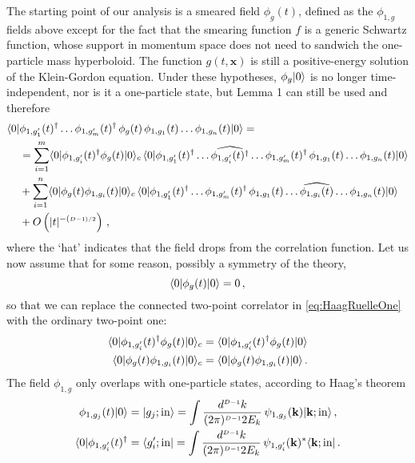The starting point of 
our analysis is a smeared field $\phi_g(t)$, defined as the $\phi_{1,g}$ fields above
except for the fact that the smearing function $f$ is a generic Schwartz function, 
whose support in momentum space does not need to sandwich the one-particle mass 
hyperboloid. The function $g(t,\mathbf{x})$ is still a positive-energy solution of 
the Klein-Gordon equation. Under these hypotheses, $\phi_{g} | 0 \rangle$ is no longer 
time-independent, nor is it a one-particle state, but Lemma 1 can still be used and 
therefore
\begin{align}
    \langle 0 | &\phi_{1,g'_1}(t)^\dagger \ldots \phi_{1,g'_m}(t)^\dagger \, 
        \phi_{g}(t) \, 
        \phi_{1,g_1}(t) \ldots \phi_{1,g_n}(t) | 0 \rangle = \nonumber \\
        &= \sum_{i=1}^m \langle 0 | \phi_{1,g'_i}(t)^\dagger \phi_{g}(t) | 0 \rangle_c \,
        \langle 0 | \phi_{1,g'_1}(t)^\dagger \ldots \widehat{\phi_{1,g'_i}(t)^\dagger}
        \ldots \phi_{1,g'_m}(t)^\dagger \, 
        \phi_{1,g_1}(t) \ldots \phi_{1,g_n}(t) | 0 \rangle \nonumber \\
        &+ \sum_{i=1}^n \langle 0 | \phi_{g}(t) \phi_{1,g_i}(t) | 0 \rangle_c \,
        \langle 0 | \phi_{1,g'_1}(t)^\dagger \ldots \phi_{1,g'_m}(t)^\dagger \, 
        \phi_{1,g_1}(t) \ldots \widehat{\phi_{1,g_i}(t)}
        \ldots \phi_{1,g_n}(t) | 0 \rangle \nonumber \\
        \label{eq:HaagRuelleOne}
        & + O\left(|t|^{-(\scriptscriptstyle{D-1})/2}\right)\, ,
\end{align}
where the `hat' indicates that the field drops from the correlation function. Let us
now assume that for some reason, possibly a symmetry of the theory, 
\begin{equation}
    \label{eq:SymmetryCondition}
    \langle 0 | \phi_{g}(t) | 0 \rangle = 0 \, ,
\end{equation}
so that we can replace the connected two-point correlator in \eqref{eq:HaagRuelleOne}
with the ordinary two-point one: 
\begin{align}
    \label{eq:ConnectNormalReplaceOne}
    \langle 0 | \phi_{1,g'_i}(t)^\dagger \phi_{g}(t) | 0 \rangle_c &= 
    \langle 0 | \phi_{1,g'_i}(t)^\dagger \phi_{g}(t) | 0 \rangle \\
    \label{eq:ConnectNormalReplaceTwo}
    \langle 0 | \phi_{g}(t) \phi_{1,g_i}(t) | 0 \rangle_c &= 
    \langle 0 | \phi_{g}(t)  \phi_{1,g_i}(t) | 0 \rangle \, .
\end{align}
The field $\phi_{1,g}$ only overlaps with one-particle states, according to 
Haag's theorem
\begin{align}
    \label{eq:OneParticleOverlap}
    \phi_{1,g_j}(t) | 0 \rangle 
        &= | g_j; \mathrm{in} \rangle = \int \frac{d^{\scriptscriptstyle{D-1}}k}{(2\pi)^{\scriptscriptstyle{D-1}} 2E_k}\, 
        \psi_{1,g_j}(\mathbf{k}) | \mathbf{k};\mathrm{in} \rangle \, , \\
    \langle 0 | \phi_{1,g'_i}(t)^\dagger
        &= \langle g'_i;\mathrm{in} | = \int \frac{d^{\scriptscriptstyle{D-1}}k}{(2\pi)^{\scriptscriptstyle{D-1}} 2E_k}\, 
        \psi_{1,g'_i}(\mathbf{k})^* \langle \mathbf{k};\mathrm{in} | \, .
\end{align}
